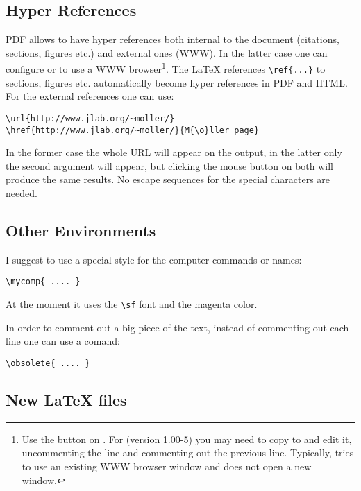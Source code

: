 \documentclass[12pt,letterpaper]{article}
\begin{document}
\subsection{Hyper References}
\label{sec:hyperref}

  PDF allows to have hyper references both internal to the document
  (citations, sections, figures etc.) and external ones (WWW). In the latter
  case one can configure  or 
  to use a WWW browser\footnote{
    Use the  button
   on . For  (version 1.00-5)
   you may need to copy 
   to  and edit it, uncommenting the line
        
   and commenting out the previous line.
   Typically,  tries to use an existing WWW browser
   window and does not open a new window.
  }.
  The \LaTeX{} references {\color{blue}\verb|\ref{...}|} to sections, 
  figures etc. automatically become hyper references in PDF and HTML.
  For the external references one can use:
  {\color{blue}
   \begin{verbatim}
\url{http://www.jlab.org/~moller/}
\href{http://www.jlab.org/~moller/}{M{\o}ller page}
  \end{verbatim}%
  }\noindent
  In the former case the whole URL will appear on the output,
  in the latter only the second argument will appear,
  but clicking the mouse button on both will produce the same
  results. No escape sequences for the special characters are 
  needed.

\subsection{Other Environments}
\label{sec:otherenv}

  I suggest to use a special style for the computer
  commands or names:
  {\color{blue}
   \begin{verbatim}
\mycomp{ .... }
  \end{verbatim}%
  }\noindent
  At the moment it uses the {\color{blue}\verb|\sf|} font
  and the magenta color.

  In order to comment out a big piece of the text, instead
  of commenting out each line one can use 
  a comand:
  {\color{blue}
   \begin{verbatim}
\obsolete{ .... }
  \end{verbatim}%
  }\noindent

\subsection{New \LaTeX{} files}
\label{sec:newlatex}
\end{document}
